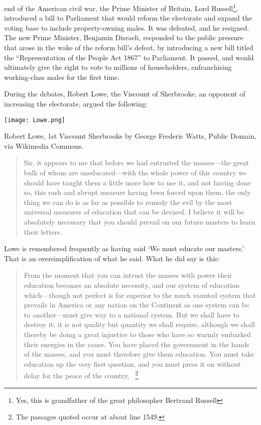  end of the American civil war, the Prime Minister of Britain, Lord Russell\footnote{Yes, this is grandfather of the great philosopher Bertrand Russell}, introduced a bill to Parliament that would reform the electorate and expand the voting base to include property-owning males. It was defeated, and he resigned. The new Prime Minister, Benjamin Disraeli, responded to the public pressure that arose in the wake of the reform bill's defeat, by introducing a new bill titled the ``Representation of the People Act 1867'' to Parliament. It passed, and would ultimately give the right to vote to millions of householders, enfranchising working-class males for the first time. 

During the debates, Robert Lowe, the Viscount of Sherbrooke, an opponent of increasing the electorate, argued the following:\begin{marginfigure}\texttt{[image: Lowe.png]}\caption{Robert Lowe, 1st Viscount Sherbrooke by George Frederic Watts, Public Domain, via Wikimedia Commons.}\label{fig:lowe}\end{marginfigure}

\begin{quote}

Sir, it appears to me that before we had entrusted the masses---the great bulk of whom are uneducated---with the whole power of this country we should have taught them a little more how to use it, and not having done so, this rash and abrupt measure having been forced upon them, the only thing we can do is as far as possible to remedy the evil by the most universal measures of education that can be devised. I believe it will be absolutely necessary that you should prevail on our future masters to learn their letters.
\end{quote}

Lowe is remembered frequently as having said `We must educate our masters.'
That is an oversimplification of what he said. What he did say is this:

\begin{quote}

From the moment that you can intrust the masses with power their education becomes an absolute necessity, and our system of education which---though not perfect is far superior to the much vaunted system that prevails in America or any nation on the Continent as one system can be to another---must give way to a national system. But we shall have to destroy it; it is not quality but quantity we shall require, although we shall thereby be doing a great injustice to those who have so warmly embarked their energies in the cause. You have placed the government in the hands of the masses, and you must therefore give them education. You must take education up the very first question, and you must press it on without delay for the peace of the country. ~\citep{Lowe:1867vo}\footnote{The passages quoted occur at about line 1549.}
\end{quote}


